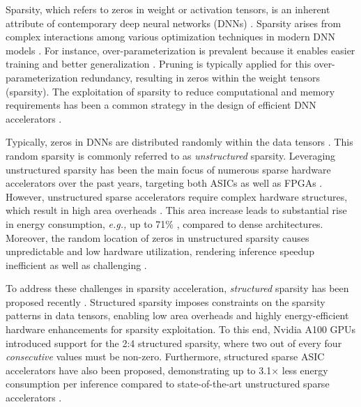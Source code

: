 Sparsity, which refers to zeros in weight or activation tensors, is an inherent attribute of contemporary deep neural networks (DNNs) \cite{Sparsity_Hoefler_2021}.
Sparsity arises from complex interactions among various  optimization techniques in modern DNN models \cite{HighLight_MIT_2023}.
For instance, over-parameterization is prevalent because it enables easier training and better generalization \cite{Sparsity_Hoefler_2021}.
Pruning is typically applied for this over-parameterization redundancy, resulting in zeros within the weight tensors (sparsity).
The exploitation of sparsity to reduce computational and memory requirements has been a common strategy in the design of efficient DNN accelerators  \cite{S2TA_HPCA_2022}. 


Typically, zeros in DNNs are distributed randomly within the data tensors \cite{Sparsity_Hoefler_2021, S2TA_HPCA_2022}. 
This random sparsity is commonly referred to as \textit{unstructured} sparsity.
Leveraging unstructured sparsity has been the main focus of numerous sparse hardware accelerators over the past years, targeting both ASICs \cite{EIE_ISCA_2016, Cambricon_X_MICRO_2016, OuterSpace_HPCA_2018, SMT_SA_2019, ExTensor_2019, SparTen_2019, Eyeriss_v2_2019, SpArch_2020} as well as FPGAs \cite{unstructured_sparsity_SpWA_FPGA_DAC_2018,
unstructured_sparsity_CNN_FPGA_FCCM_2019,
unstructured_sparsity_FPGA_UIUC_2019,
unstructured_sparsity_FPGA_Abhishek_2021,
unstructured_sparsity_CNN_TCS_2021, unstructured_FPGA_TCAD_2022}.
However, unstructured sparse accelerators require complex hardware structures, which result in high area overheads \cite{HighLight_MIT_2023}. 
This area increase leads to substantial rise in energy consumption, \emph{e.g.,} up to 71\% \cite{S2TA_HPCA_2022}, compared to dense architectures.
Moreover, the random location of zeros in unstructured sparsity causes unpredictable and low hardware utilization, rendering inference speedup inefficient as well as challenging \cite{STA_arxiv_2020, STA_arch_letters_2020, EIE_ISCA_2016}.   



To address these challenges in sparsity acceleration, 
\textit{structured} sparsity has been proposed recently \cite{Nvidia_accelerate_sparse_2021, S2TA_HPCA_2022, Vegeta_HPCA_2023}.
Structured sparsity imposes constraints on the sparsity patterns in data tensors, enabling low area overheads and highly energy-efficient hardware enhancements for sparsity exploitation.
To this end, Nvidia A100 GPUs introduced support for the 2:4 structured sparsity, 
where two out of every four \textit{consecutive} values must be non-zero.
Furthermore, structured sparse ASIC accelerators have also been proposed, demonstrating up to 3.1$\times$ less energy consumption per inference compared to state-of-the-art unstructured sparse accelerators \cite{S2TA_HPCA_2022}. 


